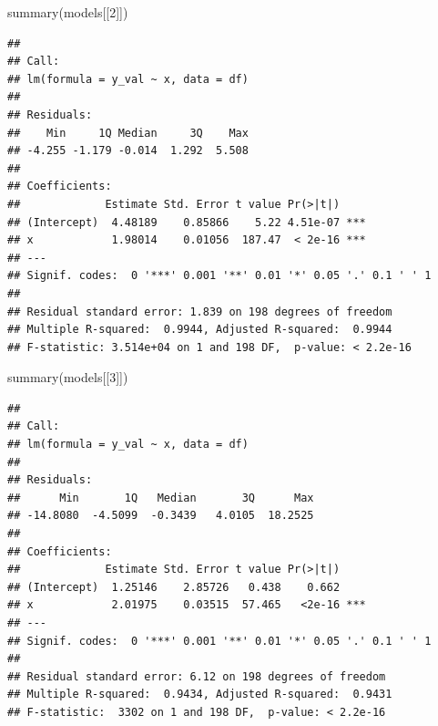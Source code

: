 \documentclass[
]{book}
\newenvironment{Shaded}{\begin{snugshade}}{\end{snugshade}}
\newcommand{\AttributeTok}[1]{\textcolor[rgb]{0.77,0.63,0.00}{#1}}
\newcommand{\ControlFlowTok}[1]{\textcolor[rgb]{0.13,0.29,0.53}{\textbf{#1}}}
\newcommand{\DecValTok}[1]{\textcolor[rgb]{0.00,0.00,0.81}{#1}}
\newcommand{\FunctionTok}[1]{\textcolor[rgb]{0.00,0.00,0.00}{#1}}
\newcommand{\NormalTok}[1]{#1}
\newcommand{\OtherTok}[1]{\textcolor[rgb]{0.56,0.35,0.01}{#1}}
\newcommand{\SpecialCharTok}[1]{\textcolor[rgb]{0.00,0.00,0.00}{#1}}
\begin{document}
\begin{Shaded}
\end{Shaded}

\begin{Shaded}
\begin{Highlighting}[]
\FunctionTok{summary}\NormalTok{(models[[}\DecValTok{2}\NormalTok{]])}
\end{Highlighting}
\end{Shaded}

\begin{verbatim}
## 
## Call:
## lm(formula = y_val ~ x, data = df)
## 
## Residuals:
##    Min     1Q Median     3Q    Max 
## -4.255 -1.179 -0.014  1.292  5.508 
## 
## Coefficients:
##             Estimate Std. Error t value Pr(>|t|)    
## (Intercept)  4.48189    0.85866    5.22 4.51e-07 ***
## x            1.98014    0.01056  187.47  < 2e-16 ***
## ---
## Signif. codes:  0 '***' 0.001 '**' 0.01 '*' 0.05 '.' 0.1 ' ' 1
## 
## Residual standard error: 1.839 on 198 degrees of freedom
## Multiple R-squared:  0.9944, Adjusted R-squared:  0.9944 
## F-statistic: 3.514e+04 on 1 and 198 DF,  p-value: < 2.2e-16
\end{verbatim}

\begin{Shaded}
\begin{Highlighting}[]
\FunctionTok{summary}\NormalTok{(models[[}\DecValTok{3}\NormalTok{]])}
\end{Highlighting}
\end{Shaded}

\begin{verbatim}
## 
## Call:
## lm(formula = y_val ~ x, data = df)
## 
## Residuals:
##      Min       1Q   Median       3Q      Max 
## -14.8080  -4.5099  -0.3439   4.0105  18.2525 
## 
## Coefficients:
##             Estimate Std. Error t value Pr(>|t|)    
## (Intercept)  1.25146    2.85726   0.438    0.662    
## x            2.01975    0.03515  57.465   <2e-16 ***
## ---
## Signif. codes:  0 '***' 0.001 '**' 0.01 '*' 0.05 '.' 0.1 ' ' 1
## 
## Residual standard error: 6.12 on 198 degrees of freedom
## Multiple R-squared:  0.9434, Adjusted R-squared:  0.9431 
## F-statistic:  3302 on 1 and 198 DF,  p-value: < 2.2e-16
\end{verbatim}
\end{document}
